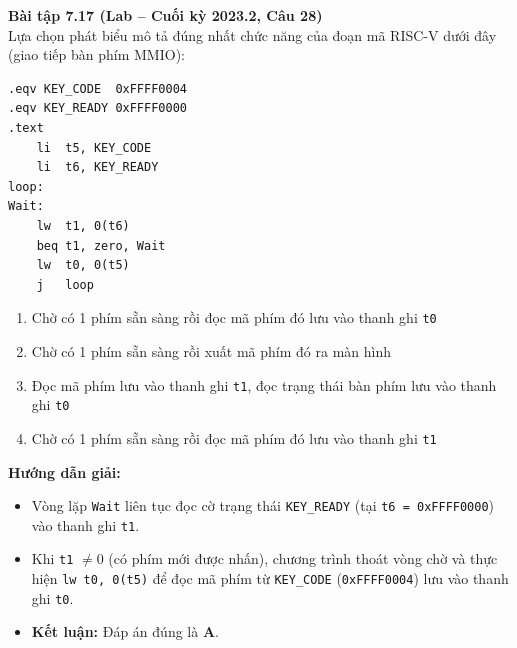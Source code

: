 \textbf{Bài tập 7.17 (Lab -- Cuối kỳ 2023.2, Câu 28)}\\
Lựa chọn phát biểu mô tả đúng nhất chức năng của đoạn mã RISC-V dưới đây (giao tiếp bàn phím MMIO):
\begin{lstlisting}
.eqv KEY_CODE  0xFFFF0004
.eqv KEY_READY 0xFFFF0000
.text
    li  t5, KEY_CODE
    li  t6, KEY_READY
loop:
Wait:
    lw  t1, 0(t6)
    beq t1, zero, Wait
    lw  t0, 0(t5)
    j   loop
\end{lstlisting}
\begin{enumerate}[label=\Alph*.]
    \item Chờ có 1 phím sẵn sàng rồi đọc mã phím đó lưu vào thanh ghi \texttt{t0}
    \item Chờ có 1 phím sẵn sàng rồi xuất mã phím đó ra màn hình
    \item Đọc mã phím lưu vào thanh ghi \texttt{t1}, đọc trạng thái bàn phím lưu vào thanh ghi \texttt{t0}
    \item Chờ có 1 phím sẵn sàng rồi đọc mã phím đó lưu vào thanh ghi \texttt{t1}
\end{enumerate}
\textbf{Hướng dẫn giải:}
\begin{itemize}
    \item Vòng lặp \texttt{Wait} liên tục đọc cờ trạng thái \texttt{KEY\_READY} (tại \texttt{t6 = 0xFFFF0000}) vào thanh ghi \texttt{t1}.
    \item Khi \texttt{t1} $\ne 0$ (có phím mới được nhấn), chương trình thoát vòng chờ và thực hiện \texttt{lw t0, 0(t5)} để đọc mã phím từ \texttt{KEY\_CODE} (\texttt{0xFFFF0004}) lưu vào thanh ghi \texttt{t0}.
    \item \textbf{Kết luận:} Đáp án đúng là \textbf{A}.
\end{itemize}

